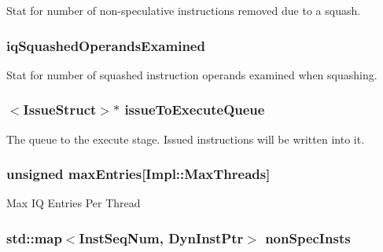 \label{classInstQueue_a6c0b47431b6e84536fd9bb61624d6d97}
Stat for number of non-\/speculative instructions removed due to a squash. \hypertarget{classInstQueue_a4398b6005b81008bd163bbba78dfd929}{
\subsubsection[{iqSquashedOperandsExamined}]{ {\bf iqSquashedOperandsExamined}}}
\label{classInstQueue_a4398b6005b81008bd163bbba78dfd929}
Stat for number of squashed instruction operands examined when squashing. \hypertarget{classInstQueue_af5c55240e63d9a13358eede4eb5352f1}{
\subsubsection[{issueToExecuteQueue}]{$<${\bf IssueStruct}$>$$\ast$ {\bf issueToExecuteQueue}}}
\label{classInstQueue_af5c55240e63d9a13358eede4eb5352f1}
The queue to the execute stage. Issued instructions will be written into it. \hypertarget{classInstQueue_a51e5f9f0cb40d61e95b1518f1be90b73}{
\subsubsection[{maxEntries}]{\setlength{\rightskip}{0pt plus 5cm}unsigned {\bf maxEntries}\mbox{[}Impl::MaxThreads\mbox{]}}}
\label{classInstQueue_a51e5f9f0cb40d61e95b1518f1be90b73}
Max IQ Entries Per Thread \hypertarget{classInstQueue_ac0ba4d07026aaf6386c001a68d059cbf}{
\subsubsection[{nonSpecInsts}]{\setlength{\rightskip}{0pt plus 5cm}std::map$<${\bf InstSeqNum}, {\bf DynInstPtr}$>$ {\bf nonSpecInsts}}}
